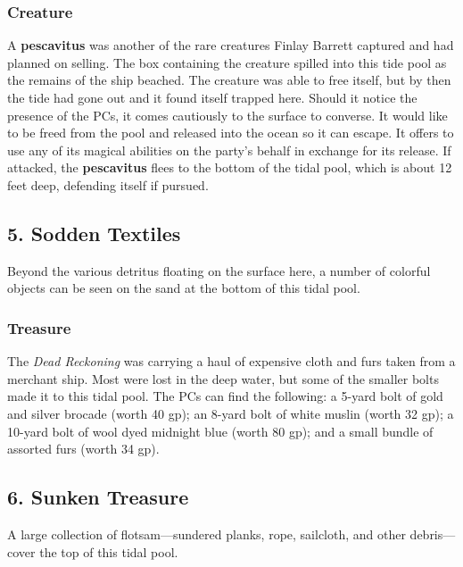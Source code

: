 \documentclass[10pt,a4paper,twoside,bg=print,twocolumn,openany,nodeprecatedcode]{dndbook}
\begin{document}
\subsubsection{Creature}
A \textbf{pescavitus} was another of the rare creatures Finlay Barrett captured and had planned on selling. The box containing the creature spilled into this tide pool as the remains of the ship beached. The creature was able to free itself, but by then the tide had gone out and it found itself trapped here. Should it notice the presence of the PCs, it comes cautiously to the surface to converse. It would like to be freed from the pool and released into the ocean so it can escape. It offers to use any of its magical abilities on the party's behalf in exchange for its release. If attacked, the \textbf{pescavitus} flees to the bottom of the tidal pool, which is about 12 feet deep, defending itself if pursued.

\subsection{5. Sodden Textiles}
\begin{DndReadAloud}{}
Beyond the various detritus floating on the surface here, a number of colorful objects can be seen on the sand at the bottom of this tidal pool.

\end{DndReadAloud}

\subsubsection{Treasure}
The \textit{Dead Reckoning} was carrying a haul of expensive cloth and furs taken from a merchant ship. Most were lost in the deep water, but some of the smaller bolts made it to this tidal pool. The PCs can find the following: a 5-yard bolt of gold and silver brocade (worth 40 gp); an 8-yard bolt of white muslin (worth 32 gp); a 10-yard bolt of wool dyed midnight blue (worth 80 gp); and a small bundle of assorted furs (worth 34 gp).

\subsection{6. Sunken Treasure}
\begin{DndReadAloud}{}
A large collection of flotsam—sundered planks, rope, sailcloth, and other debris—cover the top of this tidal pool.

\end{DndReadAloud}
\end{document}
